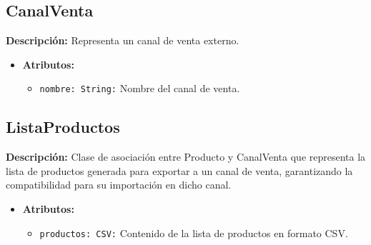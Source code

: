 \documentclass[12pt.a4paper]{article}
\begin{document}
\subsection{CanalVenta}
\textbf{Descripción:} Representa un canal de venta externo.
    \begin{itemize}
        \item {\textbf{Atributos:}}
        \begin{itemize}
            \item \texttt{nombre: String:} Nombre del canal de venta.
        \end{itemize}
    \end{itemize}

\subsection{ListaProductos}
\textbf{Descripción:} Clase de asociación entre Producto y CanalVenta que representa la lista de productos generada para exportar a un canal de venta, garantizando la compatibilidad para su importación en dicho canal.
    \begin{itemize}
        \item {\textbf{Atributos:}}
        \begin{itemize}
            \item \texttt{productos: CSV:} Contenido de la lista de productos en formato CSV.
        \end{itemize}
    \end{itemize}    
\end{document}
